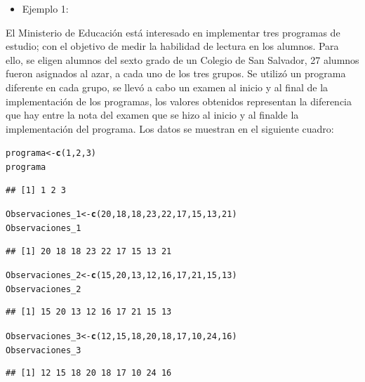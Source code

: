 \documentclass[12pt,letterpaper]{article}\usepackage[]{graphicx}\usepackage[]{color}
\makeatletter
\newcommand{\hlnum}[1]{\textcolor[rgb]{0.686,0.059,0.569}{#1}}%
\newcommand{\hlstd}[1]{\textcolor[rgb]{0.345,0.345,0.345}{#1}}%
\newcommand{\hlkwb}[1]{\textcolor[rgb]{0.69,0.353,0.396}{#1}}%
\newcommand{\hlkwd}[1]{\textcolor[rgb]{0.737,0.353,0.396}{\textbf{#1}}}%
\newenvironment{kframe}{%
 \def\at@end@of@kframe{}%
 \ifinner\ifhmode%
  \def\at@end@of@kframe{\end{minipage}}%
  \begin{minipage}{\columnwidth}%
 \fi\fi%
 \def\FrameCommand##1{\hskip\@totalleftmargin \hskip-\fboxsep
 \colorbox{shadecolor}{##1}\hskip-\fboxsep
     \hskip-\linewidth \hskip-\@totalleftmargin \hskip\columnwidth}%
 \MakeFramed {\advance\hsize-\width
   \@totalleftmargin\z@ \linewidth\hsize
   \@setminipage}}%
 {\par\unskip\endMakeFramed%
 \at@end@of@kframe}
\newenvironment{knitrout}{}{} %
\makeatother
\begin{document}
\begin{itemize}
  \item Ejemplo 1:
\end{itemize}
El Ministerio de Educaci\'on est\'a interesado en implementar tres programas de estudio; con el objetivo de medir la habilidad de lectura en los alumnos. Para ello, se eligen alumnos del sexto grado de un Colegio de San Salvador, 27 alumnos fueron asignados al azar, a cada uno de los tres grupos. Se utiliz\'o un programa diferente en cada grupo, se llev\'o a cabo un examen al inicio y al final de la implementaci\'on de los programas, los valores obtenidos representan la diferencia que hay entre la nota del examen que se hizo al inicio y al finalde la implementaci\'on del programa. Los datos se muestran en el siguiente cuadro:
\begin{knitrout}
\color{fgcolor}\begin{kframe}
\begin{alltt}
\hlstd{programa} \hlkwb{<-} \hlkwd{c}\hlstd{(}\hlnum{1}\hlstd{,} \hlnum{2}\hlstd{,} \hlnum{3}\hlstd{)}
\hlstd{programa}
\end{alltt}
\begin{verbatim}
## [1] 1 2 3
\end{verbatim}
\begin{alltt}
\hlstd{Observaciones_1} \hlkwb{<-} \hlkwd{c}\hlstd{(}\hlnum{20}\hlstd{,} \hlnum{18}\hlstd{,} \hlnum{18}\hlstd{,} \hlnum{23}\hlstd{,} \hlnum{22}\hlstd{,} \hlnum{17}\hlstd{,} \hlnum{15}\hlstd{,} \hlnum{13}\hlstd{,} \hlnum{21}\hlstd{)}
\hlstd{Observaciones_1}
\end{alltt}
\begin{verbatim}
## [1] 20 18 18 23 22 17 15 13 21
\end{verbatim}
\begin{alltt}
\hlstd{Observaciones_2} \hlkwb{<-} \hlkwd{c}\hlstd{(}\hlnum{15}\hlstd{,} \hlnum{20}\hlstd{,} \hlnum{13}\hlstd{,} \hlnum{12}\hlstd{,} \hlnum{16}\hlstd{,} \hlnum{17}\hlstd{,} \hlnum{21}\hlstd{,} \hlnum{15}\hlstd{,} \hlnum{13}\hlstd{)}
\hlstd{Observaciones_2}
\end{alltt}
\begin{verbatim}
## [1] 15 20 13 12 16 17 21 15 13
\end{verbatim}
\begin{alltt}
\hlstd{Observaciones_3} \hlkwb{<-} \hlkwd{c}\hlstd{(}\hlnum{12}\hlstd{,} \hlnum{15}\hlstd{,} \hlnum{18}\hlstd{,} \hlnum{20}\hlstd{,} \hlnum{18}\hlstd{,} \hlnum{17}\hlstd{,} \hlnum{10}\hlstd{,} \hlnum{24}\hlstd{,} \hlnum{16}\hlstd{)}
\hlstd{Observaciones_3}
\end{alltt}
\begin{verbatim}
## [1] 12 15 18 20 18 17 10 24 16
\end{verbatim}
\end{kframe}
\end{knitrout}
\end{document}
